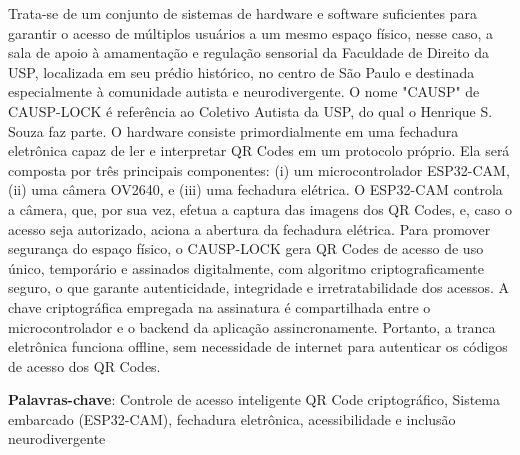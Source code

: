 \documentclass[
	12pt,				%
	openright,			%
	twoside,			%
	a4paper,			%
	english,			%
	french,				%
	spanish,			%
	brazil				%
	]{abntex2}
\begin{document}


\setlength{\absparsep}{18pt} %
\begin{resumo}
Trata-se de um conjunto de sistemas de hardware e software suficientes para garantir o acesso de múltiplos usuários a um mesmo espaço físico, nesse caso, a sala de apoio à amamentação e regulação sensorial da Faculdade de Direito da USP, localizada em seu prédio histórico, no centro de São Paulo e destinada especialmente à comunidade autista e neurodivergente. O nome "CAUSP" de CAUSP-LOCK é referência ao Coletivo Autista da USP, do qual o Henrique S. Souza faz parte.
O hardware consiste primordialmente em uma fechadura eletrônica capaz de ler e interpretar QR Codes em um protocolo próprio. Ela será composta por três principais componentes: (i) um microcontrolador ESP32-CAM, (ii) uma câmera OV2640, e (iii) uma fechadura elétrica. O ESP32-CAM controla a câmera, que, por sua vez, efetua a captura das imagens dos QR Codes, e, caso o acesso seja autorizado, aciona a abertura da fechadura elétrica. 
Para promover segurança do espaço físico, o CAUSP-LOCK gera QR Codes de acesso de uso único, temporário e assinados digitalmente, com algoritmo criptograficamente seguro, o que garante autenticidade, integridade e irretratabilidade dos acessos. A chave criptográfica empregada na assinatura é compartilhada entre o microcontrolador e o backend da aplicação assincronamente. Portanto, a tranca eletrônica funciona offline, sem necessidade de internet para autenticar os códigos de acesso dos QR Codes.

 \textbf{Palavras-chave}: Controle de acesso inteligente
QR Code criptográfico, Sistema embarcado (ESP32-CAM), fechadura eletrônica, acessibilidade e inclusão neurodivergente
\end{resumo}
\end{document}
